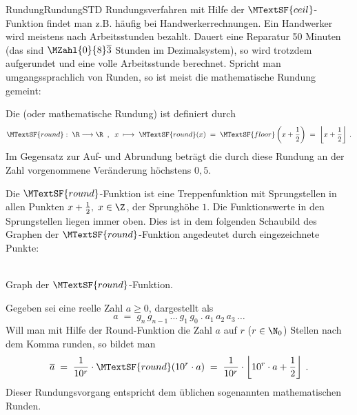 \begin{MXContent}{Rundung}{Rundung}{STD}
Rundungsverfahren mit Hilfe der $\MTextSF{ceil}$-Funktion findet man z.B. häufig bei Handwerkerrechnungen. Ein Handwerker wird meistens nach Arbeitsstunden bezahlt.
Dauert eine Reparatur 50 Minuten (das sind $\MZahl{0}{8}\overline{3}$ Stunden im Dezimalsystem), so wird trotzdem aufgerundet und eine volle Arbeitsstunde berechnet.
Spricht man umgangssprachlich von Runden, so ist meist die mathematische Rundung gemeint:

\begin{MInfo}
Die  (oder mathematische Rundung) ist definiert durch
$$
\MTextSF{round}:\; \R\longrightarrow\R\;\; , \;\;
x\;\longmapsto\; \MTextSF{round}(x)\;=\; \MTextSF{floor}\left({x + \frac{1}{2}}\right) \; =\; \left\lfloor{ x + \frac{1}{2} }\right\rfloor\: .
$$
Im Gegensatz zur Auf- und Abrundung beträgt die durch diese Rundung an der Zahl vorgenommene Veränderung höchstens $0,5$.
\end{MInfo}

Die $\MTextSF{round}$-Funktion ist eine Treppenfunktion mit Sprungstellen in allen Punkten $x+\frac{1}{2},\; x\in \Z$, der Sprunghöhe $1$.
Die Funktionswerte in den Sprungstellen liegen immer oben. Dies ist in dem folgenden Schaubild des Graphen der $\MTextSF{round}$-Funktion angedeutet durch eingezeichnete Punkte:

\begin{center}
\\
Graph der $\MTextSF{round}$-Funktion.
\end{center}

Gegeben sei eine reelle Zahl $a\geq 0$, dargestellt als 
$$
a \;=\; g_n\, g_{n-1}\, \ldots\, g_1\, g_0\: .\: a_1\,a_2\, a_3\, \ldots
$$
Will man mit Hilfe der Round-Funktion die Zahl $a$ auf $r$ ($r\in\N_0$) Stellen nach dem Komma runden, so bildet man
$$
\overline{a}\; =\; \frac{1}{10^{r}}\cdot \MTextSF{round}(10^{r}\cdot a)\; =\; \frac{1}{10^{r}}\cdot \left\lfloor{ 10^{r}\cdot a + \frac{1}{2} }\right\rfloor\: .
$$
Dieser Rundungsvorgang entspricht dem üblichen sogenannten mathematischen Runden.


\end{MXContent}
